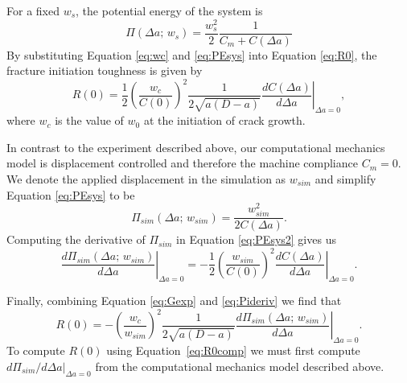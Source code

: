 \documentclass[12pt,onecolumn]{article}
\begin{document}
\begin{bibunit}
For a fixed $w_s$, the potential energy of the system is
%
\begin{equation}
    \label{eq:PEsys}
     \Pi(\Delta a;\,w_s)=\frac{w_s^2}{2}\frac{1}{C_m+C(\Delta a)}
 \end{equation}
%
By substituting Equation \eqref{eq:wc} and \eqref{eq:PEsys} into Equation \eqref{eq:R0}, the fracture initiation toughness is given by
%
\begin{equation}
    \label{eq:Gexp}
    R(0)=\frac{1}{2}\left(\frac{w_c}{C(0)}\right)^2\frac{1}{2\sqrt{a(D-a)}}\left.\frac{dC(\Delta a)}{d\Delta a}\right\vert_{\Delta a=0},
\end{equation}
%
where $w_c$ is the value of $w_0$ at the initiation of crack growth.


In contrast to the experiment described above, our computational mechanics model is displacement controlled and therefore the machine compliance $C_m=0$. We denote the applied displacement in the simulation as $w_{sim}$ and simplify Equation \eqref{eq:PEsys} to be
%
\begin{equation}
    \label{eq:PEsys2}
    \Pi_{sim}(\Delta a;\,w_{sim})=\frac{w_{sim}^2}{2C(\Delta a)}.
\end{equation}
%
Computing the derivative of $\Pi_{sim}$ in Equation \eqref{eq:PEsys2} gives us
%
\begin{equation}
    \label{eq:Pideriv}
    \left.\frac{d \Pi_{sim}(\Delta a;\,w_{sim})}{d\Delta a}\right\vert_{\Delta a=0}=-\frac{1}{2}\left(\frac{w_{sim}}{C(0)}\right)^2\left.\frac{dC(\Delta a)}{d\Delta a}\right\vert_{\Delta a=0}.
\end{equation}

Finally, combining Equation \eqref{eq:Gexp} and \eqref{eq:Pideriv} we find that
%
\begin{equation}
    \label{eq:R0comp}
    R(0)=-\left(\frac{w_c}{w_{sim}}\right)^2\frac{1}{2\sqrt{a(D-a)}}\left.\frac{d\Pi_{sim}(\Delta a;\,w_{sim})}{d\Delta a}\right \vert_{\Delta a=0}.
\end{equation}
%
To compute $R(0)$ using Equation~\eqref{eq:R0comp} we must first compute $d\Pi_{sim}/d\Delta a\vert_{\Delta a=0}$ from the computational mechanics model described above.


\end{bibunit}
\end{document}
